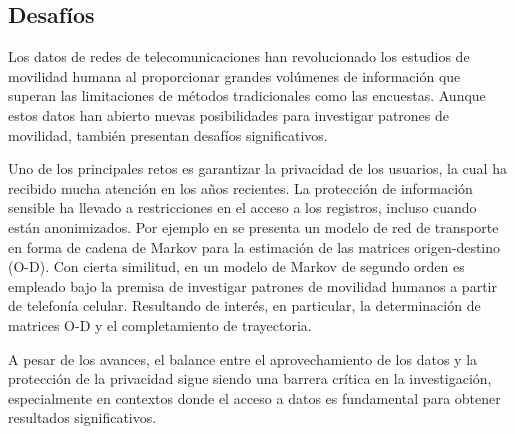 \subsection*{Desafíos}

Los datos de redes de telecomunicaciones han revolucionado los estudios de movilidad humana al proporcionar grandes volúmenes de información que superan las limitaciones de métodos tradicionales como las encuestas. Aunque estos datos han abierto nuevas posibilidades para investigar patrones de movilidad, también presentan desafíos significativos.

Uno de los principales retos es garantizar la privacidad de los usuarios, la cual ha recibido mucha atención en los años recientes. La protección de información sensible ha llevado a restricciones en el acceso a los registros, incluso cuando están anonimizados. Por ejemplo en \cite{tesselkin2017estimation} se presenta un modelo de red de transporte en forma de cadena de Markov para la estimación de las matrices origen-destino (O-D). Con cierta similitud, en \cite{pourmoradnasseri2019od} un modelo de Markov de segundo orden es empleado bajo la premisa de investigar patrones de movilidad humanos a partir de telefonía celular. Resultando de interés, en particular, la determinación de matrices O-D y el completamiento de trayectoria.

A pesar de los avances, el balance entre el aprovechamiento de los datos y la protección de la privacidad sigue siendo una barrera crítica en la investigación, especialmente en contextos donde el acceso a datos es fundamental para obtener resultados significativos.




